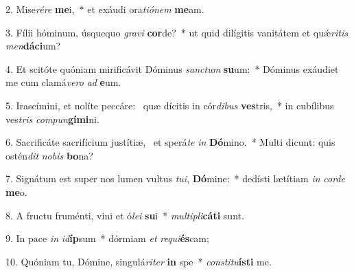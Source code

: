 2. Mise\textit{ré}\textit{re} \textbf{me}i,~*  et exáudi ora\textit{ti}\textit{ó}\textit{nem} \textbf{me}am.\

3. Fílii hóminum, úsquequo \textit{gra}\textit{vi} \textbf{cor}de?~*  ut quid dilígitis vanitátem et quǽ\textit{ri}\textit{tis} \textit{men}\textbf{dá}\textbf{ci}um?\

4. Et scitóte quóniam mirificávit Dóminus \textit{sanc}\textit{tum} \textbf{su}um:~*  Dóminus exáudiet me cum clamá\textit{ve}\textit{ro} \textit{ad} \textbf{e}um.\

5. Irascímini, et nolíte peccáre: \dag\  quæ dícitis in cór\textit{di}\textit{bus} \textbf{ves}tris,~*  in cubílibus ves\textit{tris} \textit{com}\textit{pun}\textbf{gí}\textbf{mi}ni.\

6. Sacrificáte sacrifícium justítiæ, \dag\  et sperá\textit{te} \textit{in} \textbf{Dó}mino.~*  Multi dicunt: quis ostén\textit{dit} \textit{no}\textit{bis} \textbf{bo}na?\

7. Signátum est super nos lumen vultus \textit{tu}\textit{i}, \textbf{Dó}mine:~*  dedísti lætítiam \textit{in} \textit{cor}\textit{de} \textbf{me}o.\

8. A fructu fruménti, vini et ó\textit{le}\textit{i} \textbf{su}i~*  \textit{mul}\textit{ti}\textit{pli}\textbf{cá}\textbf{ti} sunt.\

9. In pace \textit{in} \textit{id}\textbf{íp}sum~*  dórmiam \textit{et} \textit{re}\textit{qui}\textbf{és}cam;\

10. Quóniam tu, Dómine, singulá\textit{ri}\textit{ter} \textbf{in} spe~*  \textit{con}\textit{sti}\textit{tu}\textbf{ís}\textbf{ti} me.\

